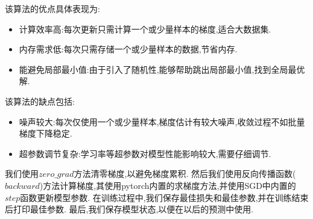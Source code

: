 该算法的优点具体表现为:

\begin{itemize}
    \item 计算效率高:每次更新只需计算一个或少量样本的梯度,适合大数据集. 
    \item 内存需求低:每次只需存储一个或少量样本的数据,节省内存. 
    \item 能避免局部最小值:由于引入了随机性,能够帮助跳出局部最小值,找到全局最优解. 
\end{itemize}

该算法的缺点包括:

\begin{itemize}
    \item 噪声较大:每次仅使用一个或少量样本,梯度估计有较大噪声,收敛过程不如批量梯度下降稳定. 
    \item 超参数调节复杂:学习率等超参数对模型性能影响较大,需要仔细调节. 
\end{itemize}

    我们使用$zero\_grad$方法清零梯度,以避免梯度累积. 然后我们使用反向传播函数($backward$)方法计算梯度,其使用pytorch内置的求梯度方法\cite{paszke2017automatic},并使用SGD中内置的$step$函数更新模型参数. 在训练过程中,我们保存最佳损失和最佳参数,并在训练结束后打印最佳参数. 最后,我们保存模型状态,以便在以后的预测中使用. 
